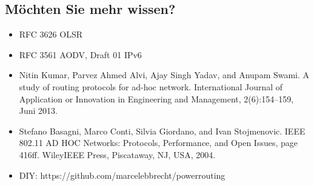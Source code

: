 \documentclass[11pt,handout,notes=only]{beamer}
\begin{document}
\subsection{Möchten Sie mehr wissen?}

\begin{frame}{\insertsubsection}
\begin{itemize}
\item RFC 3626 OLSR
\item RFC 3561 AODV, Draft 01 IPv6
\item Nitin Kumar, Parvez Ahmed Alvi, Ajay Singh Yadav, and Anupam Swami.
A study of routing protocols for ad-hoc network. International Journal of Application or Innovation in Engineering and Management, 2(6):154–159, Juni 2013.
\item Stefano Basagni, Marco Conti, Silvia Giordano, and Ivan Stojmenovic. IEEE
802.11 AD HOC Networks: Protocols, Performance, and Open Issues, page
416ff. WileyIEEE Press, Piscataway, NJ, USA, 2004.
\item DIY: https://github.com/marcelebbrecht/powerrouting
\end{itemize}
\end{frame}
\end{document}
